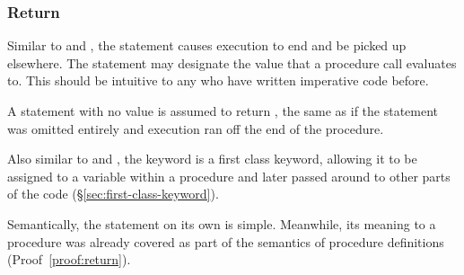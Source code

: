\subsubsection{Return}

Similar to  and , the  statement causes execution
to end and be picked up elsewhere. The  statement may designate the value
that a procedure call evaluates to. This should be intuitive to any who have written
imperative code before.

A  statement with no value is assumed to return , the same as if
the  statement was omitted entirely and execution ran off the end of the
procedure.

Also similar to  and , the  keyword is a first class
keyword, allowing it to be assigned to a variable within a procedure and later passed
around to other parts of the code (\S\ref{sec:first-class-keyword}).

\begin{bnf*}
\end{bnf*}

Semantically, the  statement on its own is simple. Meanwhile, its meaning
to a procedure was already covered as part of the semantics of procedure definitions
(Proof~\ref{proof:return}).

\begin{prooftree}
\end{prooftree}

